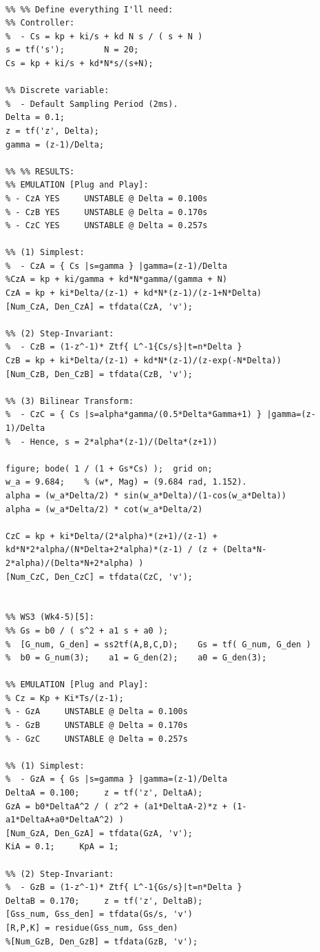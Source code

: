 \documentclass[11pt]{article}
\begin{document}
\begin{lstlisting}[frame=single]
%% WS3 (Wk4-5)[4]:

%% %% Define everything I'll need:
%% Controller:
%  - Cs = kp + ki/s + kd N s / ( s + N )
s = tf('s');        N = 20;
Cs = kp + ki/s + kd*N*s/(s+N);

%% Discrete variable:
%  - Default Sampling Period (2ms).
Delta = 0.1;
z = tf('z', Delta);
gamma = (z-1)/Delta;

%% %% RESULTS:
%% EMULATION [Plug and Play]:
% - CzA YES     UNSTABLE @ Delta = 0.100s
% - CzB YES     UNSTABLE @ Delta = 0.170s
% - CzC YES     UNSTABLE @ Delta = 0.257s

%% (1) Simplest:
%  - CzA = { Cs |s=gamma } |gamma=(z-1)/Delta
%CzA = kp + ki/gamma + kd*N*gamma/(gamma + N)
CzA = kp + ki*Delta/(z-1) + kd*N*(z-1)/(z-1+N*Delta)
[Num_CzA, Den_CzA] = tfdata(CzA, 'v');

%% (2) Step-Invariant:
%  - CzB = (1-z^-1)* Ztf{ L^-1{Cs/s}|t=n*Delta }
CzB = kp + ki*Delta/(z-1) + kd*N*(z-1)/(z-exp(-N*Delta))
[Num_CzB, Den_CzB] = tfdata(CzB, 'v');

%% (3) Bilinear Transform:
%  - CzC = { Cs |s=alpha*gamma/(0.5*Delta*Gamma+1) } |gamma=(z-1)/Delta
%  - Hence, s = 2*alpha*(z-1)/(Delta*(z+1))

figure; bode( 1 / (1 + Gs*Cs) );  grid on;
w_a = 9.684;    % (w*, Mag) = (9.684 rad, 1.152).
alpha = (w_a*Delta/2) * sin(w_a*Delta)/(1-cos(w_a*Delta))
alpha = (w_a*Delta/2) * cot(w_a*Delta/2)

CzC = kp + ki*Delta/(2*alpha)*(z+1)/(z-1) + kd*N*2*alpha/(N*Delta+2*alpha)*(z-1) / (z + (Delta*N-2*alpha)/(Delta*N+2*alpha) )
[Num_CzC, Den_CzC] = tfdata(CzC, 'v');


%% WS3 (Wk4-5)[5]:
%% Gs = b0 / ( s^2 + a1 s + a0 );
%  [G_num, G_den] = ss2tf(A,B,C,D);    Gs = tf( G_num, G_den )
%  b0 = G_num(3);    a1 = G_den(2);    a0 = G_den(3);

%% EMULATION [Plug and Play]:
% Cz = Kp + Ki*Ts/(z-1);
% - GzA     UNSTABLE @ Delta = 0.100s
% - GzB     UNSTABLE @ Delta = 0.170s
% - GzC     UNSTABLE @ Delta = 0.257s

%% (1) Simplest:
%  - GzA = { Gs |s=gamma } |gamma=(z-1)/Delta
DeltaA = 0.100;     z = tf('z', DeltaA);
GzA = b0*DeltaA^2 / ( z^2 + (a1*DeltaA-2)*z + (1-a1*DeltaA+a0*DeltaA^2) )
[Num_GzA, Den_GzA] = tfdata(GzA, 'v');
KiA = 0.1;     KpA = 1;

%% (2) Step-Invariant:
%  - GzB = (1-z^-1)* Ztf{ L^-1{Gs/s}|t=n*Delta }
DeltaB = 0.170;     z = tf('z', DeltaB);
[Gss_num, Gss_den] = tfdata(Gs/s, 'v')
[R,P,K] = residue(Gss_num, Gss_den)
%[Num_GzB, Den_GzB] = tfdata(GzB, 'v');


\end{lstlisting}
\end{document}
